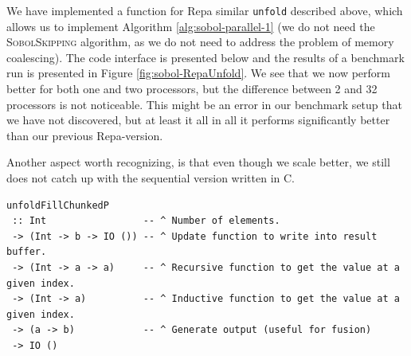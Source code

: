 We have implemented a function for Repa similar \lstinline{unfold}
described above, which allows us to implement Algorithm
\ref{alg:sobol-parallel-1} (we do not need the \textsc{SobolSkipping}
algorithm, as we do not need to address the problem of memory
coalescing). The code interface is presented below and the results of
a benchmark run is presented in Figure \ref{fig:sobol-RepaUnfold}. We
see that we now perform better for both one and two processors, but
the difference between 2 and 32 processors is not noticeable. This
might be an error in our benchmark setup that we have not discovered,
but at least it all in all it performs significantly better than our
previous Repa-version.

Another aspect worth recognizing, is that even though we scale better,
we still does not catch up with the sequential version written in C.

\begin{adjustbox}{minipage=1.3\textwidth,margin=0pt \smallskipamount,center}
\begin{lstlisting}
unfoldFillChunkedP
 :: Int                 -- ^ Number of elements.
 -> (Int -> b -> IO ()) -- ^ Update function to write into result buffer.
 -> (Int -> a -> a)     -- ^ Recursive function to get the value at a given index.
 -> (Int -> a)          -- ^ Inductive function to get the value at a given index.
 -> (a -> b)            -- ^ Generate output (useful for fusion)
 -> IO ()
\end{lstlisting}
\end{adjustbox}

